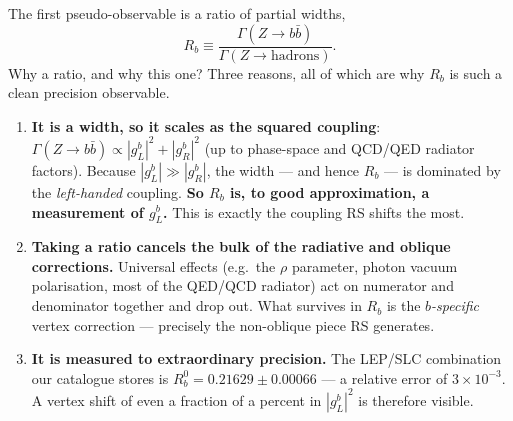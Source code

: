 \documentclass[11pt]{article}
\newcommand{\gL}{g_L^b}
\newcommand{\gR}{g_R^b}
\theoremstyle{definition}
\begin{document}
The first pseudo-observable is a ratio of partial widths,
\begin{equation}
R_b \equiv \frac{\Gamma(Z\to b\bar b)}{\Gamma(Z\to \text{hadrons})}.
\label{eq:Rbdef}
\end{equation}
Why a ratio, and why this one? Three reasons, all of which are why $R_b$ is such
a clean precision observable.
\begin{enumerate}[leftmargin=1.6em]
\item \textbf{It is a width, so it scales as the squared coupling}:
$\Gamma(Z\to b\bar b) \propto |\gL|^2 + |\gR|^2$ (up to phase-space and QCD/QED
radiator factors). Because $|\gL| \gg |\gR|$, the width --- and hence $R_b$ ---
is dominated by the \emph{left-handed} coupling. \textbf{So $R_b$ is, to good
approximation, a measurement of $\gL$.} This is exactly the coupling RS shifts
the most.
\item \textbf{Taking a ratio cancels the bulk of the radiative and oblique
corrections.} Universal effects (e.g.\ the $\rho$ parameter, photon vacuum
polarisation, most of the QED/QCD radiator) act on numerator and denominator
together and drop out. What survives in $R_b$ is the \emph{$b$-specific} vertex
correction --- precisely the non-oblique piece RS generates.
\item \textbf{It is measured to extraordinary precision.} The LEP/SLC
combination our catalogue stores is $R_b^0 = 0.21629 \pm 0.00066$ --- a relative
error of $3\times10^{-3}$. A vertex shift of even a fraction of a percent in
$|\gL|^2$ is therefore visible.
\end{enumerate}
\end{document}
